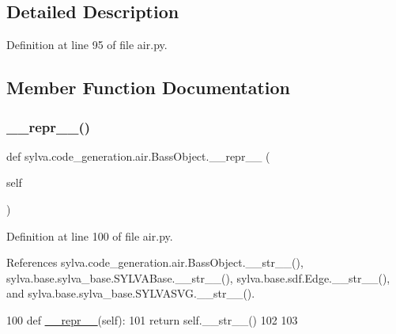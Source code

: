 \subsection{Detailed Description}


Definition at line 95 of file air.\+py.



\subsection{Member Function Documentation}
\mbox{\label{classsylva_1_1code__generation_1_1air_1_1_bass_object_a17548b84b2a55240a429506aed418292}} 
\subsubsection{\texorpdfstring{\+\_\+\+\_\+repr\+\_\+\+\_\+()}{\_\_repr\_\_()}}
{\footnotesize\ttfamily def sylva.\+code\+\_\+generation.\+air.\+Bass\+Object.\+\_\+\+\_\+repr\+\_\+\+\_\+ (\begin{DoxyParamCaption}\item[{}]{self }\end{DoxyParamCaption})}



Definition at line 100 of file air.\+py.



References sylva.\+code\+\_\+generation.\+air.\+Bass\+Object.\+\_\+\+\_\+str\+\_\+\+\_\+(), sylva.\+base.\+sylva\+\_\+base.\+S\+Y\+L\+V\+A\+Base.\+\_\+\+\_\+str\+\_\+\+\_\+(), sylva.\+base.\+sdf.\+Edge.\+\_\+\+\_\+str\+\_\+\+\_\+(), and sylva.\+base.\+sylva\+\_\+base.\+S\+Y\+L\+V\+A\+S\+V\+G.\+\_\+\+\_\+str\+\_\+\+\_\+().


\begin{DoxyCode}
100     \textcolor{keyword}{def }\hyperlink{namespacesylva_1_1code__generation_1_1floorplanner_a84f24b1e40f5425e9bb40ab45ccbd10f}{\_\_repr\_\_}(self):
101         \textcolor{keywordflow}{return} self.\_\_str\_\_()
102 
103 
\end{DoxyCode}
\mbox{\label{classsylva_1_1code__generation_1_1air_1_1_bass_object_a2c164720220479369c29db97b67aabe8}} 
